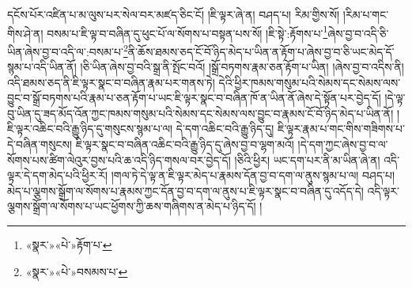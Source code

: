 དངོས་པོར་འཛིན་པ་མ་ལུས་པར་སེལ་བར་མཛད་ཅིང་ངོ། །ཇི་ལྟར་ཞེ་ན། བཤད་པ། རིམ་གྱིས་སོ། །རིམ་པ་གང་གིས་ཤེ་ན། བསམ་པ་ཇི་ལྟ་བ་བཞིན་དུ་ཕུང་པོ་ལ་སོགས་པ་བསྟན་པས་སོ། །ཇི་སྟེ་:རྟོགས་པ་\footnote{«སྣར་»«པེ་»རྟོག་པ་}ཞེས་བྱ་བ་འདི་ཅི་ཡིན་ཞེས་བྱ་བ་འདི་ལ་:བསམ་པ་\footnote{«སྣར་»«པེ་»བསམས་པ་}ནི་ཆོས་ཐམས་ཅད་ངོ་བོ་ཉིད་མེད་པ་ཡིན་ན་རྟོག་པ་ཞེས་བྱ་བ་ཅི་ཡང་མེད་དོ་སྙམ་པ་འདི་ཡིན་ནོ། །ཅི་ཡིན་ཞེས་བྱ་བའི་སྒྲ་ནི་སྤོང་བའོ། །སྒྲོ་བཏགས་རྣམ་ཅན་རྟོག་པ་ཡིན། །ཞེས་བྱ་བ་འདིས་ནི། འདི་ཐམས་ཅད་ནི་ཇི་ལྟར་སྣང་བ་བཞིན་རྣམ་པར་གནས་ཏེ། དེའི་ཕྱིར་ཁམས་གསུམ་པའི་སེམས་དང་སེམས་ལས་བྱུང་བ་སྒྲོ་བཏགས་པའི་རྣམ་པ་ཅན་རྟོག་པ་ཡང་ཇི་ལྟར་སྣང་བ་བཞིན་ཁོ་ན་ཡིན་ནོ་ཞེས་དེ་སྟོན་པར་བྱེད་དོ། །དེ་ལྟ་བུ་ཡིན་དུ་ཟད་མོད་འོན་ཀྱང་ཁམས་གསུམ་པའི་སེམས་དང་སེམས་ལས་བྱུང་བ་རྣམས་ངོ་བོ་ཉིད་མེད་པ་ཡིན་ནོ། །ཇི་ལྟར་འཆིང་བའི་རྒྱུ་ཉིད་དུ་གསུངས་སྙམ་པ་ལ། དེ་དག་འཆིང་བའི་རྒྱུ་ཉིད་དུ། ཇི་ལྟར་རྣམ་པ་གང་གིས་གཟིགས་པ་དེ་བཞིན་གསུངས། ཇི་ལྟར་སྣང་བ་བཞིན་འཆིང་བའི་རྒྱུ་ཉིད་དུ་ཞེས་བྱ་བ་ལྷག་མའོ། །དེ་དག་ཀྱང་ཞེས་བྱ་བ་ལ་སོགས་པས་ཚིག་ལེའུར་བྱས་པའི་ཆ་འདི་ཉིད་གསལ་བར་བྱེད་དོ། །ཅིའི་ཕྱིར། ཡང་དག་པར་ནི་མ་ཡིན་ཞེ་ན། འདི་ལྟར་དེ་དག་མེད་པའི་ཕྱིར་རོ། །གལ་ཏེ་དེ་ལྟ་ན་ཇི་ལྟར་མེད་པ་རྣམས་དོན་བྱ་བ་དག་ལ་ནུས་སྙམ་པ་ལ། བཤད་པ། མེད་པ་ལྕགས་སྒྲོག་ལ་སོགས་པ་རྣམས་ཀྱང་དོན་བྱ་བ་དག་ལ་ནུས་པ་ཇི་ལྟར་སྣང་བ་བཞིན་དུ་འདོད་དེ། འདི་ལྟར་ལྕགས་སྒྲོག་ལ་སོགས་པ་ཡང་ཕྱོགས་ཀྱི་ཆས་གཞིགས་ན་མེད་པ་ཉིད་དོ། །
